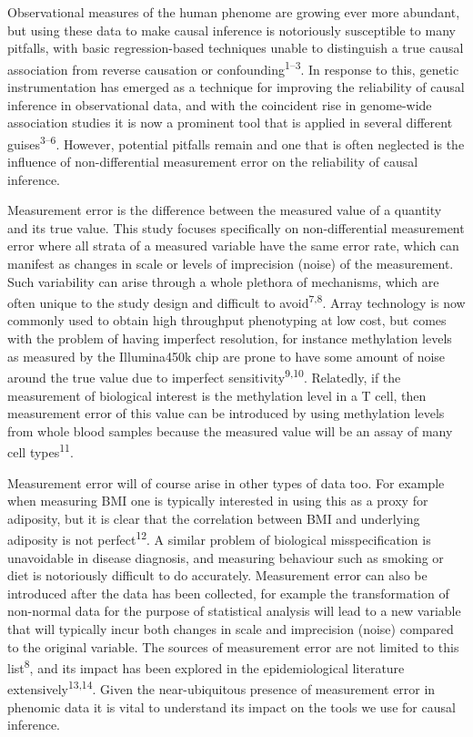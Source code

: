\documentclass[]{article}
\begin{document}
Observational measures of the human phenome are growing ever more
abundant, but using these data to make causal inference is notoriously
susceptible to many pitfalls, with basic regression-based techniques
unable to distinguish a true causal association from reverse causation
or confounding\textsuperscript{1--3}. In response to this, genetic
instrumentation has emerged as a technique for improving the reliability
of causal inference in observational data, and with the coincident rise
in genome-wide association studies it is now a prominent tool that is
applied in several different guises\textsuperscript{3--6}. However,
potential pitfalls remain and one that is often neglected is the
influence of non-differential measurement error on the reliability of
causal inference.

Measurement error is the difference between the measured value of a
quantity and its true value. This study focuses specifically on
non-differential measurement error where all strata of a measured
variable have the same error rate, which can manifest as changes in
scale or levels of imprecision (noise) of the measurement. Such
variability can arise through a whole plethora of mechanisms, which are
often unique to the study design and difficult to
avoid\textsuperscript{7,8}. Array technology is now commonly used to
obtain high throughput phenotyping at low cost, but comes with the
problem of having imperfect resolution, for instance methylation levels
as measured by the Illumina450k chip are prone to have some amount of
noise around the true value due to imperfect
sensitivity\textsuperscript{9,10}. Relatedly, if the measurement of
biological interest is the methylation level in a T cell, then
measurement error of this value can be introduced by using methylation
levels from whole blood samples because the measured value will be an
assay of many cell types\textsuperscript{11}.

Measurement error will of course arise in other types of data too. For
example when measuring BMI one is typically interested in using this as
a proxy for adiposity, but it is clear that the correlation between BMI
and underlying adiposity is not perfect\textsuperscript{12}. A similar
problem of biological misspecification is unavoidable in disease
diagnosis, and measuring behaviour such as smoking or diet is
notoriously difficult to do accurately. Measurement error can also be
introduced after the data has been collected, for example the
transformation of non-normal data for the purpose of statistical
analysis will lead to a new variable that will typically incur both
changes in scale and imprecision (noise) compared to the original
variable. The sources of measurement error are not limited to this
list\textsuperscript{8}, and its impact has been explored in the
epidemiological literature extensively\textsuperscript{13,14}. Given the
near-ubiquitous presence of measurement error in phenomic data it is
vital to understand its impact on the tools we use for causal inference.
\end{document}
